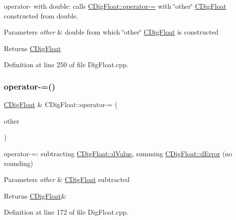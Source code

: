 operator-\/ with double\+: calls \hyperlink{classCDigFloat_a7496a4f8445815e9a346076c3d90305a}{C\+Dig\+Float\+::operator-\/=} with \char`\"{}other\char`\"{} \hyperlink{classCDigFloat}{C\+Dig\+Float} constructed from double. 


\begin{DoxyParams}{Parameters}
{\em other} & double from which \char`\"{}other\char`\"{} \hyperlink{classCDigFloat}{C\+Dig\+Float} is constructed \\
\hline
\end{DoxyParams}
\begin{DoxyReturn}{Returns}
\hyperlink{classCDigFloat}{C\+Dig\+Float} 
\end{DoxyReturn}


Definition at line 250 of file Dig\+Float.\+cpp.

\mbox{\label{classCDigFloat_a7496a4f8445815e9a346076c3d90305a}} 
\subsubsection{\texorpdfstring{operator-\/=()}{operator-=()}\hspace{0.1cm}{\footnotesize\ttfamily [1/2]}}
{\footnotesize\ttfamily \hyperlink{classCDigFloat}{C\+Dig\+Float} \& C\+Dig\+Float\+::operator-\/= (\begin{DoxyParamCaption}\item[{const \hyperlink{classCDigFloat}{C\+Dig\+Float} \&}]{other }\end{DoxyParamCaption})}



operator-\/=\+: subtracting \hyperlink{classCDigFloat_a4bbe69e30dd4e20527362493aa9aaf96}{C\+Dig\+Float\+::d\+Value}, summing \hyperlink{classCDigFloat_a25eb3782d1e727ff007a48f8308e3d4d}{C\+Dig\+Float\+::d\+Error} (no rounding) 


\begin{DoxyParams}{Parameters}
{\em other} & \hyperlink{classCDigFloat}{C\+Dig\+Float} subtracted \\
\hline
\end{DoxyParams}
\begin{DoxyReturn}{Returns}
\hyperlink{classCDigFloat}{C\+Dig\+Float}\& 
\end{DoxyReturn}


Definition at line 172 of file Dig\+Float.\+cpp.



